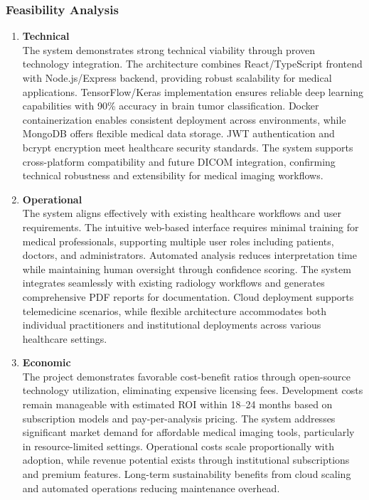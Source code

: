 \subsubsection{Feasibility Analysis}
\begin{enumerate}[label=\roman*.]
    \item \textbf{Technical} \\
          The system demonstrates strong technical viability through proven technology integration. The architecture combines React/TypeScript frontend with Node.js/Express backend, providing robust scalability for medical applications. TensorFlow/Keras implementation ensures reliable deep learning capabilities with 90\% accuracy in brain tumor classification. Docker containerization enables consistent deployment across environments, while MongoDB offers flexible medical data storage. JWT authentication and bcrypt encryption meet healthcare security standards. The system supports cross-platform compatibility and future DICOM integration, confirming technical robustness and extensibility for medical imaging workflows.

    \item \textbf{Operational} \\
          The system aligns effectively with existing healthcare workflows and user requirements. The intuitive web-based interface requires minimal training for medical professionals, supporting multiple user roles including patients, doctors, and administrators. Automated analysis reduces interpretation time while maintaining human oversight through confidence scoring. The system integrates seamlessly with existing radiology workflows and generates comprehensive PDF reports for documentation. Cloud deployment supports telemedicine scenarios, while flexible architecture accommodates both individual practitioners and institutional deployments across various healthcare settings.
    \item \textbf{Economic} \\
          The project demonstrates favorable cost-benefit ratios through open-source technology utilization, eliminating expensive licensing fees. Development costs remain manageable with estimated ROI within 18--24 months based on subscription models and pay-per-analysis pricing. The system addresses significant market demand for affordable medical imaging tools, particularly in resource-limited settings. Operational costs scale proportionally with adoption, while revenue potential exists through institutional subscriptions and premium features. Long-term sustainability benefits from cloud scaling and automated operations reducing maintenance overhead.


\end{enumerate}
